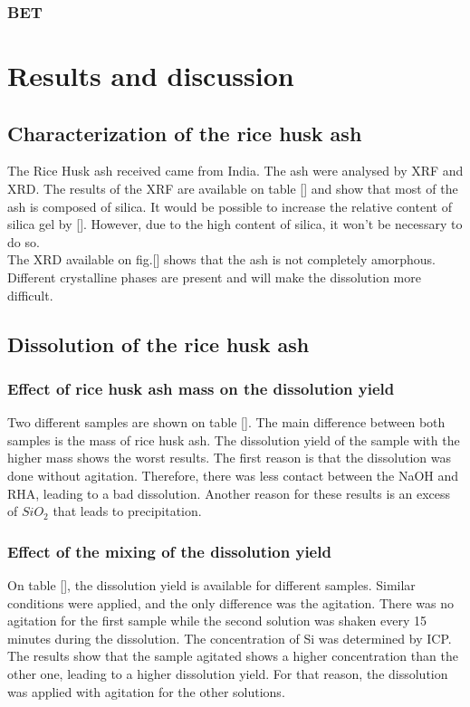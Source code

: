 \documentclass[12pt,a4paper]{article}
\begin{document}
\subsubsection*{BET}



\section{Results and discussion} 
\subsection{Characterization of the rice husk ash}
The Rice Husk ash received came from India. The ash were analysed by XRF and XRD. The results of the XRF are available on table [] and show that most of the ash is composed of silica. It would be possible to increase the relative content of silica gel by []. However, due to the high content of silica, it won't be necessary to do so. \\
The XRD available on fig.[] shows that the ash is not completely amorphous. Different crystalline phases are present and will make the dissolution more difficult. 
\subsection{Dissolution of the rice husk ash}
\subsubsection{Effect of  rice husk ash mass on the dissolution yield}
Two different samples are shown on table []. The main difference between both samples is the mass of rice husk ash. The dissolution yield of the sample with the higher mass shows the worst results. The first reason is that the dissolution was done without agitation. Therefore, there was less contact between the NaOH and RHA, leading to a bad dissolution. Another reason for these results is an excess of $SiO_2$ that leads to precipitation. 
\subsubsection{Effect of the mixing of the dissolution yield}
On table [], the dissolution yield is available for different samples. Similar conditions were applied, and the only difference was the agitation. There was no agitation for the first sample while the second solution was shaken every 15 minutes during the dissolution. The concentration of Si was determined by ICP. The results show that the sample agitated shows a higher concentration than the other one, leading to a higher dissolution yield. For that reason, the dissolution was applied with agitation for the other solutions.
\end{document}
